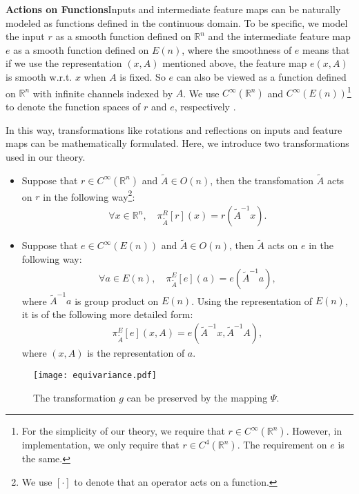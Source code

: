 \documentclass{article}
\begin{document}
\textbf{Actions on Functions}\quad Inputs and intermediate feature maps can be naturally modeled as functions defined in the continuous domain. To be specific, we model the input $r$ as a smooth function defined on $\mathbb{R}^n$ and the intermediate feature map $e$ as a smooth function defined on $E(n)$, where the smoothness of $e$ means that if we use the representation $(x,A)$ mentioned above, the feature map $e(x,A)$ is smooth w.r.t. $x$ when $A$ is fixed. So $e$ can also be viewed as a function defined on $\mathbb{R}^n$ with infinite channels indexed by $A$. We use $C^{\infty}(\mathbb{R}^n)$ and $C^{\infty}(E(n))$\footnote{For the simplicity of our theory, we require that $r\in C^{\infty}(\mathbb{R}^n)$. However, in implementation, we only require that $r\in C^{4}(\mathbb{R}^n)$. The requirement on $e$ is the same.} to denote the function spaces of $r$ and $e$, respectively .

In this way, transformations like rotations and reflections on inputs and feature maps can be mathematically formulated. Here, we introduce two transformations used in our theory.
\begin{itemize}
	\item Suppose that $r\in C^\infty(\mathbb{R}^n)$ and $\widetilde{A} \in O(n)$, then the transfomation $\widetilde{A}$ acts on $r$ in the following way\footnote{We use $[\cdot]$ to denote that an operator acts on a function.}: 
	\begin{align}
	\forall x \in \mathbb{R}^n,\quad \pi^{R}_{\widetilde A}[r](x)=r(\widetilde A^{-1}x).
	\label{T1}
	\end{align}


	\item Suppose that $e \in C^\infty(E(n))$ and $\widetilde A\in O(n)$, then $\widetilde A$ acts on $e$ in the following way: 	
	\begin{align}
	\forall a \in E(n),\quad \pi^{E}_{\widetilde A}[e](a)=e({\widetilde{A}}^{-1}a),
	\label{31}
	\end{align}
	where $\widetilde{A}^{-1}a$ is group product on $E(n)$. Using the representation of $E(n)$, it is of the
	following more detailed form:
	\begin{align}
	\pi^{E}_{\widetilde A}[e](x,A)=e( \widetilde {A}^{-1}x, \widetilde{A}^{-1} A), \label{T2}
	\end{align} 
	where $(x,A)$ is the representation of $a$.
	
\end{itemize}

\begin{figure}
	\centering
	\texttt{[image: equivariance.pdf]} \caption{The transformation $g$ can be preserved by the mapping $\Psi$.}
	\label{equivariance}
\end{figure}
\end{document}
